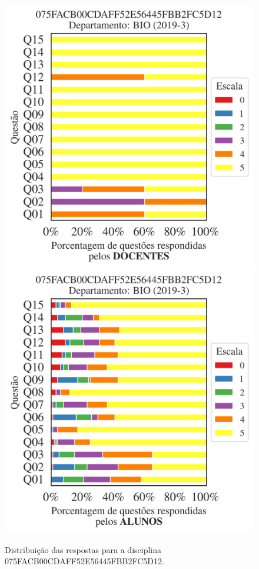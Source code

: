 \documentclass[a4paper,10pt]{article}
\begin{document}
\begin{figure}[h]
\centering
\includegraphics[width=0.485\linewidth]{analise_disciplina_departamento_BIO_075FACB00CDAFF52E56445FBB2FC5D12_docentes.png}
\includegraphics[width=0.485\linewidth]{analise_disciplina_departamento_BIO_075FACB00CDAFF52E56445FBB2FC5D12_alunos.png}
\caption{\label{fig:analise_geral_departamento}                Distribuição das respostas para a disciplina 075FACB00CDAFF52E56445FBB2FC5D12. }
\end{figure}
\end{document}
